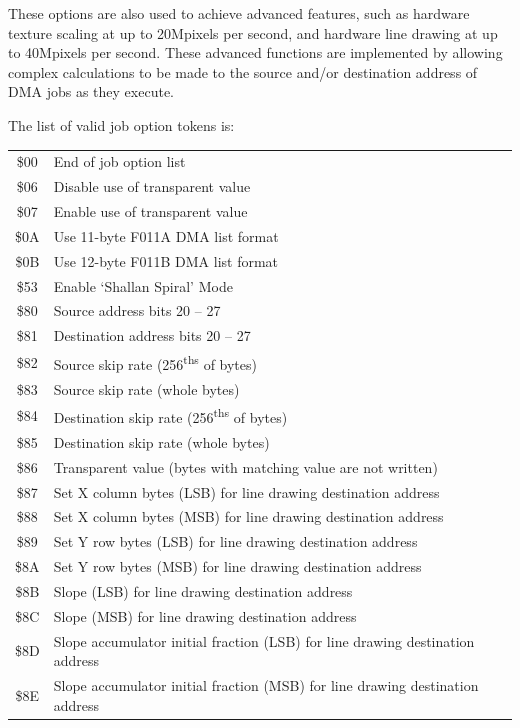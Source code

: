These options are also used to achieve advanced features, such as hardware
texture scaling at up to 20Mpixels per second, and hardware line drawing
at up to 40Mpixels per second. These advanced functions are implemented
by allowing complex calculations to be made to the source and/or destination
address of DMA jobs as they execute.

The list of valid job option tokens is:

\begin{tabular}{|c|p{10cm}|}
  \hline
  \$00 & End of job option list \\
  \$06 & Disable use of transparent value \\
  \$07 & Enable use of transparent value \\
  \$0A & Use 11-byte F011A DMA list format \\
  \$0B & Use 12-byte F011B DMA list format \\
  \$53 & Enable `Shallan Spiral' Mode \\
  \$80 & Source address bits 20 -- 27 \\
  \$81 & Destination address bits 20 -- 27 \\
  \$82 & Source skip rate (256\textsuperscript{ths} of bytes) \\
  \$83 & Source skip rate (whole bytes) \\
  \$84 & Destination skip rate (256\textsuperscript{ths} of bytes) \\
  \$85 & Destination skip rate (whole bytes) \\
  \$86 & Transparent value (bytes with matching value are not written) \\
  \$87 & Set X column bytes (LSB) for line drawing destination address \\
  \$88 & Set X column bytes (MSB) for line drawing destination address \\
  \$89 & Set Y row bytes (LSB) for line drawing destination address \\
  \$8A & Set Y row bytes (MSB) for line drawing destination address \\
  \$8B & Slope (LSB) for line drawing destination address \\
  \$8C & Slope (MSB) for line drawing destination address \\
  \$8D & Slope accumulator initial fraction (LSB) for line drawing destination address \\
  \$8E & Slope accumulator initial fraction (MSB) for line drawing destination address \\

\end{tabular}

